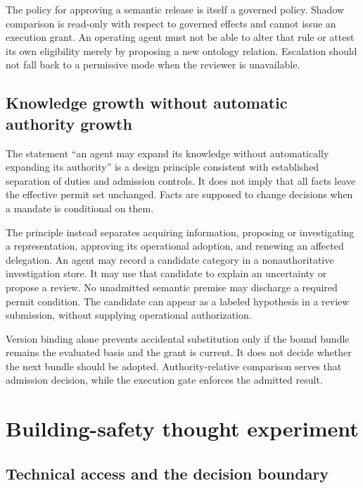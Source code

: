 \documentclass[
  english,
  12pt,
  a4paper,
  preprint,
  numbers,
  nopreprintline]{elsarticle}
\begin{document}
The policy for approving a semantic release is itself a governed policy.
Shadow comparison is read-only with respect to governed effects and
cannot issue an execution grant. An operating agent must not be able to
alter that rule or attest its own eligibility merely by proposing a new
ontology relation. Escalation should not fall back to a permissive mode
when the reviewer is unavailable.

\subsection{Knowledge growth without automatic authority
growth}\label{knowledge-growth-without-automatic-authority-growth}

The statement ``an agent may expand its knowledge without automatically
expanding its authority'' is a design principle consistent with
established separation of duties and admission controls. It does not
imply that all facts leave the effective permit set unchanged. Facts are
supposed to change decisions when a mandate is conditional on them.

The principle instead separates acquiring information, proposing or
investigating a representation, approving its operational adoption, and
renewing an affected delegation. An agent may record a candidate
category in a nonauthoritative investigation store. It may use that
candidate to explain an uncertainty or propose a review. No unadmitted
semantic premise may discharge a required permit condition. The
candidate can appear as a labeled hypothesis in a review submission,
without supplying operational authorization.

Version binding alone prevents accidental substitution only if the bound
bundle remains the evaluated basis and the grant is current. It does not
decide whether the next bundle should be adopted. Authority-relative
comparison serves that admission decision, while the execution gate
enforces the admitted result.

\section{Building-safety thought
experiment}\label{building-safety-thought-experiment}

\subsection{Technical access and the decision
boundary}\label{technical-access-and-the-decision-boundary}
\end{document}
